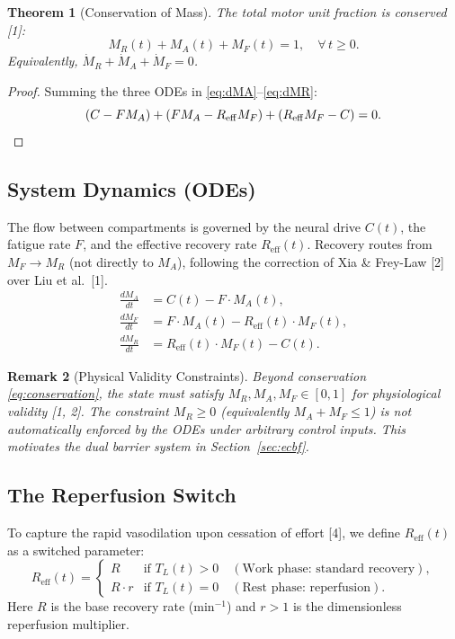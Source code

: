 \documentclass[11pt,a4paper]{article}
\newtheorem{theorem}{Theorem}[section]
\newtheorem{remark}[theorem]{Remark}
\begin{document}
\begin{theorem}[Conservation of Mass]
The total motor unit fraction is conserved [1]:
\begin{equation}\label{eq:conservation}
M_R(t) + M_A(t) + M_F(t) = 1, \quad \forall\, t \geq 0.
\end{equation}
Equivalently, $\dot M_R + \dot M_A + \dot M_F = 0$.
\end{theorem}

\begin{proof}
Summing the three ODEs in \eqref{eq:dMA}--\eqref{eq:dMR}:
\[
(C - F M_A) + (F M_A - R_{\mathrm{eff}} M_F) + (R_{\mathrm{eff}} M_F - C) = 0. \qedhere
\]
\end{proof}

\subsection{System Dynamics (ODEs)}

The flow between compartments is governed by the neural drive $C(t)$,
the fatigue rate $F$, and the effective recovery rate
$R_{\mathrm{eff}}(t)$. Recovery routes from $M_F \to M_R$ (not directly
to $M_A$), following the correction of Xia \& Frey-Law [2] over Liu et
al.\ [1].
\begin{align}
\frac{dM_A}{dt} &= C(t) - F \cdot M_A(t), \label{eq:dMA}\\
\frac{dM_F}{dt} &= F \cdot M_A(t) - R_{\mathrm{eff}}(t) \cdot M_F(t), \label{eq:dMF}\\
\frac{dM_R}{dt} &= R_{\mathrm{eff}}(t) \cdot M_F(t) - C(t). \label{eq:dMR}
\end{align}

\begin{remark}[Physical Validity Constraints]
Beyond conservation \eqref{eq:conservation}, the state must satisfy
$M_R, M_A, M_F \in [0,1]$ for physiological validity [1, 2]. The
constraint $M_R \geq 0$ (equivalently $M_A + M_F \leq 1$) is not
automatically enforced by the ODEs under arbitrary control inputs.
This motivates the dual barrier system in Section~\ref{sec:ecbf}.
\end{remark}

\subsection{The Reperfusion Switch}

To capture the rapid vasodilation upon cessation of effort [4], we
define $R_{\mathrm{eff}}(t)$ as a switched parameter:
\begin{equation}\label{eq:reff}
R_{\mathrm{eff}}(t) =
\begin{cases}
R & \text{if } T_L(t) > 0 \quad (\text{Work phase: standard recovery}), \\
R \cdot r & \text{if } T_L(t) = 0 \quad (\text{Rest phase: reperfusion}).
\end{cases}
\end{equation}
Here $R$ is the base recovery rate (min$^{-1}$) and $r > 1$ is the
dimensionless reperfusion multiplier.
\end{document}
